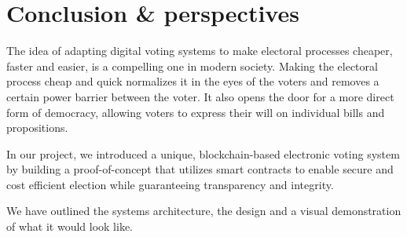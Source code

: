 \chapter{Conclusion \& perspectives}

The idea of adapting digital voting systems to make electoral processes cheaper, faster and easier, is a compelling
one in modern society. Making the electoral process cheap
and quick normalizes it in the eyes of the voters and removes a
certain power barrier between the voter. It also opens the door for a more direct form of democracy, allowing voters to express their will on individual bills and propositions.

In our project, we introduced a unique, blockchain-based electronic voting system by building a proof-of-concept that utilizes smart contracts to enable secure and cost efficient election while guaranteeing transparency and integrity.

We have outlined the systems architecture, the design and a visual demonstration of what it would look like. %

